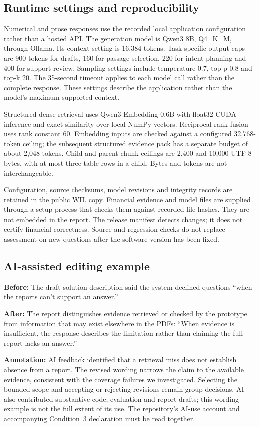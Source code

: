 \subsection{Runtime settings and reproducibility}
\label{app:runtime_details}
Numerical and prose responses use the recorded local application configuration rather than a hosted API. The generation model is Qwen3 8B, Q4\_K\_M, through Ollama. Its context setting is 16,384 tokens. Task-specific output caps are 900 tokens for drafts, 160 for passage selection, 220 for intent planning and 400 for support review. Sampling settings include temperature 0.7, top-p 0.8 and top-k 20. The 35-second timeout applies to each model call rather than the complete response. These settings describe the application rather than the model's maximum supported context.

Structured dense retrieval uses Qwen3-Embedding-0.6B with float32 CUDA inference and exact similarity over local NumPy vectors. Reciprocal rank fusion uses rank constant 60. Embedding inputs are checked against a configured 32,768-token ceiling; the subsequent structured evidence pack has a separate budget of about 2,048 tokens. Child and parent chunk ceilings are 2,400 and 10,000 UTF-8 bytes, with at most three table rows in a child. Bytes and tokens are not interchangeable.

Configuration, source checksums, model revisions and integrity records are retained in the public WIL copy. Financial evidence and model files are supplied through a setup process that checks them against recorded file hashes. They are not embedded in the report. The release manifest detects changes; it does not certify financial correctness. Source and regression checks do not replace assessment on new questions after the software version has been fixed.

\subsection{AI-assisted editing example}
\label{app:ai_process}
\textbf{Before:} The draft solution description said the system declined questions ``when the reports can't support an answer.''

\textbf{After:} The report distinguishes evidence retrieved or checked by the prototype from information that may exist elsewhere in the PDFs: ``When evidence is insufficient, the response describes the limitation rather than claiming the full report lacks an answer.''

\textbf{Annotation:} AI feedback identified that a retrieval miss does not establish absence from a report. The revised wording narrows the claim to the available evidence, consistent with the coverage failures we investigated. Selecting the bounded scope and accepting or rejecting revisions remain group decisions. AI also contributed substantive code, evaluation and report drafts; this wording example is not the full extent of its use. The repository's \href{https://github.com/AyushiNegi20/COSC2669-WIL-PROJECT/blob/report-submission-2026-10-25/report/AI_USE.md}{AI-use account} and accompanying Condition~3 declaration must be read together.

